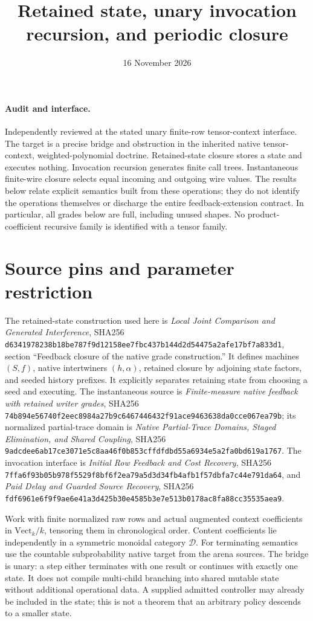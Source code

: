 \documentclass[11pt]{article}
\title{Retained state, unary invocation recursion, and periodic closure}
\date{16 November 2026}
\begin{document}
\maketitle
\paragraph{Audit and interface.} Independently reviewed at the stated unary finite-row tensor-context interface. The target is a precise bridge and obstruction in the inherited native tensor-context, weighted-polynomial doctrine. Retained-state closure stores a state and executes nothing. Invocation recursion generates finite call trees. Instantaneous finite-wire closure selects equal incoming and outgoing wire values. The results below relate explicit semantics built from these operations; they do not identify the operations themselves or discharge the entire feedback-extension contract. In particular, all grades below are full, including unused shapes. No product-coefficient recursive family is identified with a tensor family.

\section{Source pins and parameter restriction}
The retained-state construction used here is \emph{Local Joint Comparison and Generated Interference}, SHA256
\texttt{d6341978238b18be787f9d12158ee7fbc437b144d2d54475a2afe17bf7a833d1},
section ``Feedback closure of the native grade construction.'' It defines machines $(S,f)$, native intertwiners $(h,\alpha)$, retained closure by adjoining state factors, and seeded history prefixes. It explicitly separates retaining state from choosing a seed and executing.
The instantaneous source is \emph{Finite-measure native feedback with retained writer grades}, SHA256
\texttt{74b894e56740f2eec8984a27b9c6467446432f91ace9463638da0cce067ea79b}; its normalized partial-trace domain is \emph{Native Partial-Trace Domains, Staged Elimination, and Shared Coupling}, SHA256
\texttt{9adcdee6ab17ce3071e5c8aa46f0b853cffdfdbd55a6934e5a2fa0bd619a1767}.
The invocation interface is \emph{Initial Row Feedback and Cost Recovery}, SHA256
\texttt{7ffa6f93b05b978f5529f8bf6f2ea79a5d3d34fb4afb1f57dbfa7c44e791da64}, and \emph{Paid Delay and Guarded Source Recovery}, SHA256
\texttt{fdf6961e6f9f9ae6e41a3d425b30e4585b3e7e513b0178ac8fa88cc35535aea9}.

Work with finite normalized raw rows and actual augmented context coefficients in $\mathrm{Vect}_k/k$, tensoring them in chronological order. Content coefficients lie independently in a symmetric monoidal category $\mathcal D$. For terminating semantics use the countable subprobability native target from the arena sources. The bridge is unary: a step either terminates with one result or continues with exactly one state. It does not compile multi-child branching into shared mutable state without additional operational data. A supplied admitted controller may already be included in the state; this is not a theorem that an arbitrary policy descends to a smaller state.
\end{document}
